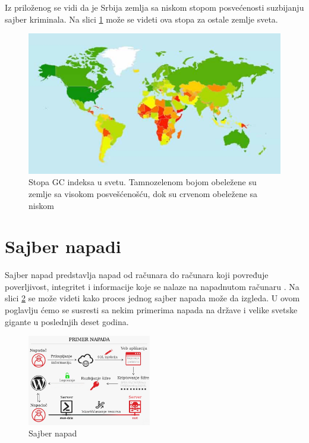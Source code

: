 \documentclass[a4paper]{article}
\theoremstyle{break}
\begin{document}
{Iz priloženog se vidi da je Srbija zemlja sa niskom stopom posvećenosti suzbijanju sajber kriminala. Na slici \ref{fig:svet} može se videti ova stopa za ostale zemlje sveta.

\begin{figure}[h!]
\begin{center}
\includegraphics[scale = 0.3]{itu_worldmap.jpg}
\end{center}
\caption{Stopa GC indeksa u svetu. Tamnozelenom bojom obeležene su zemlje sa visokom posvešćenošću, dok su crvenom obeležene sa niskom}
\label{fig:svet}
\end{figure}

\newpage


\section{Sajber napadi}
\label{sec:sajber_napadi}

Sajber napad predstavlja napad od računara do računara koji povređuje poverljivost, integritet i informacije koje se nalaze na napadnutom računaru \cite{knjiga}. Na slici \ref{fig:primer_napada} se može videti kako proces jednog sajber napada može da izgleda. U ovom poglavlju ćemo se susresti sa nekim primerima napada na države i velike svetske gigante u poslednjih deset godina.


\begin{figure}[h!]
\begin{center}
\includegraphics[width=0.48\textwidth]{napad.png}
\end{center}
\caption{Sajber napad}
\label{fig:primer_napada}
\end{figure}

}
\end{document}
